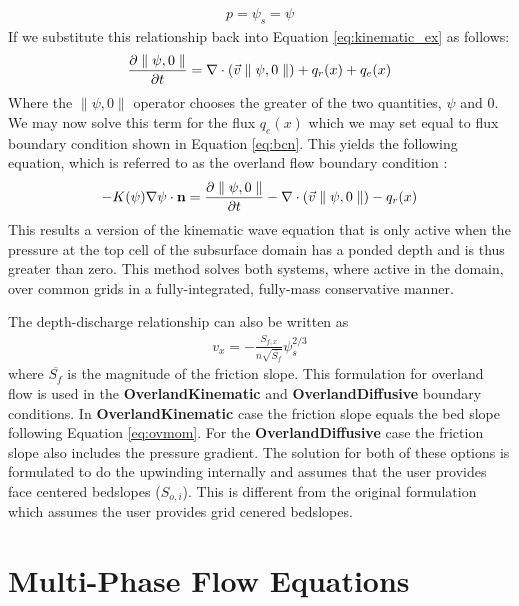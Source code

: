 \begin{eqnarray}
p = \psi_s = \psi
\label{eq:press_cont}
\end{eqnarray}
If we substitute this relationship back into Equation \ref{eq:kinematic_ex} as follows:
\begin{eqnarray}
\frac{\partial \parallel\psi,0\parallel}{\partial t} =
\nabla \cdot ({\vec v} \parallel\psi,0\parallel) + q_r(x) + q_e(x)
\label{eq:OF_BC_ex}
\end{eqnarray}
Where the $\parallel\psi,0\parallel$ operator chooses the greater of the two quantities, $\psi$ and $0$.  We may now solve this term for the flux $q_e(x)$ which we may set equal to flux boundary condition shown in Equation \ref{eq:bcn}.  This yields the following equation, which is referred to as the overland flow boundary condition \cite{KM06}:
\begin{eqnarray}
-K(\psi)\nabla \psi \cdot {\bf n}  = \frac{\partial \parallel\psi,0\parallel}{\partial t} -
\nabla \cdot ({\vec v} \parallel\psi,0\parallel) - q_r(x)
\label{eq:overland_bc}
\end{eqnarray}
This results a version of the kinematic wave equation that is only active when the pressure at the top cell of the subsurface domain has a ponded depth and is thus greater than zero.  This method solves both systems, where active in the domain, over common grids in a fully-integrated, fully-mass conservative manner.


The depth-discharge relationship can also be written as
\begin{eqnarray}
v_x=- \frac{S_{f,x}}{n\sqrt{\overline{S_{f}}}}\psi_{s}^{2/3}
\label{eq:manningsnew}
\end{eqnarray}
where $\overline{S_{f}}$ is the magnitude of the friction slope. This formulation for
overland flow is used in the {\bf OverlandKinematic} and {\bf OverlandDiffusive} boundary conditions.  In {\bf OverlandKinematic} case the friction slope equals the bed slope following Equation \ref{eq:ovmom}. For the {\bf OverlandDiffusive} case the friction slope also includes the pressure gradient. The solution for both of these options is formulated to do the upwinding internally and assumes that the user provides face centered bedslopes ($S_{o,i}$). This is different from the original formulation which assumes the user provides grid cenered bedslopes.

\section{Multi-Phase Flow Equations}
\label{Multi-Phase Flow Equations}

